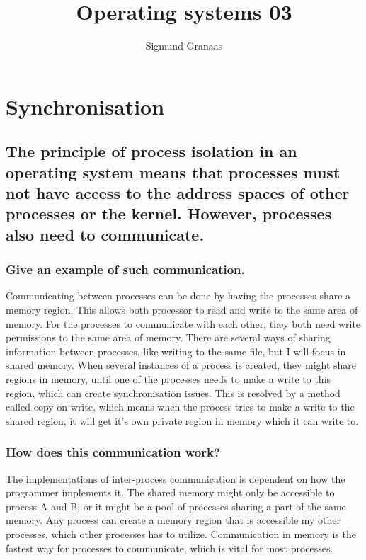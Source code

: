 \documentclass[a4paper]{article}
\title{Operating systems 03}
\author{Sigmund Granaas}
\begin{document}
\maketitle


\section{Synchronisation}

\subsection{The principle of process isolation in an operating system means that processes must not have access
to the address spaces of other processes or the kernel. However, processes also need to communicate.}
\subsubsection{Give an example of such communication.}

Communicating between processes can be done by having the processes share a memory region. This allows both processor to read and write to the same area of memory. For the processes to communicate with each other, they both need write permissions to the same area of memory. There are several ways of sharing information between processes, like writing to the same file, but I will focus in shared memory. When several instances of a process is created, they might share regions in memory, until one of the processes needs to make a write to this region, which can create synchronisation issues. This is resolved by a method called copy on write, which means when the process tries to make a write to the shared region, it will get it's own private region in memory which it can write to.


\subsubsection{How does this communication work?}
The implementations of inter-process communication is dependent on how the programmer implements it. The shared memory might only be accessible to process A and B, or it might be a pool of processes sharing a part of the same memory. Any process can create a memory region that is accessible my other processes, which other processes has to utilize. Communication in memory is the fastest way for processes to communicate, which is vital for most processes. 
\end{document}
